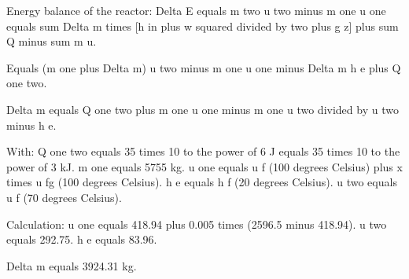 Energy balance of the reactor:  
Delta E equals m two u two minus m one u one equals sum Delta m times [h in plus w squared divided by two plus g z] plus sum Q minus sum m u.  

Equals (m one plus Delta m) u two minus m one u one minus Delta m h e plus Q one two.  

Delta m equals Q one two plus m one u one minus m one u two divided by u two minus h e.  

With:  
Q one two equals 35 times 10 to the power of 6 J equals 35 times 10 to the power of 3 kJ.  
m one equals 5755 kg.  
u one equals u f (100 degrees Celsius) plus x times u fg (100 degrees Celsius).  
h e equals h f (20 degrees Celsius).  
u two equals u f (70 degrees Celsius).  

Calculation:  
u one equals 418.94 plus 0.005 times (2596.5 minus 418.94).  
u two equals 292.75.  
h e equals 83.96.  

Delta m equals 3924.31 kg.